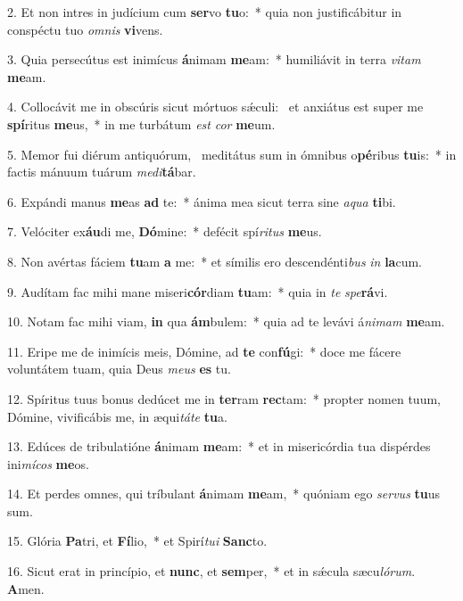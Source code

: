 2. Et non intres in judícium cum \textbf{ser}vo \textbf{tu}o:~*  quia non justificábitur in conspéctu tuo \textit{om}\textit{nis} \textbf{vi}vens.\

3. Quia persecútus est inimícus \textbf{á}nimam \textbf{me}am:~*  humiliávit in terra \textit{vi}\textit{tam} \textbf{me}am.\

4. Collocávit me in obscúris sicut mórtuos sǽculi: \dag\  et anxiátus est super me \textbf{spí}ritus \textbf{me}us,~*  in me turbátum \textit{est} \textit{cor} \textbf{me}um.\

5. Memor fui diérum antiquórum, \dag\  meditátus sum in ómnibus o\textbf{pé}ribus \textbf{tu}is:~*  in factis mánuum tuárum \textit{me}\textit{di}\textbf{tá}bar.\

6. Expándi manus \textbf{me}as \textbf{ad} te:~*  ánima mea sicut terra sine \textit{a}\textit{qua} \textbf{ti}bi.\

7. Velóciter ex\textbf{áu}di me, \textbf{Dó}mine:~*  defécit spí\textit{ri}\textit{tus} \textbf{me}us.\

8. Non avértas fáciem \textbf{tu}am \textbf{a} me:~*  et símilis ero descendénti\textit{bus} \textit{in} \textbf{la}cum.\

9. Audítam fac mihi mane miseri\textbf{cór}diam \textbf{tu}am:~*  quia in \textit{te} \textit{spe}\textbf{rá}vi.\

10. Notam fac mihi viam, \textbf{in} qua \textbf{ám}bulem:~*  quia ad te levávi á\textit{ni}\textit{mam} \textbf{me}am.\

11. Eripe me de inimícis meis, Dómine, ad \textbf{te} con\textbf{fú}gi:~*  doce me fácere voluntátem tuam, quia Deus \textit{me}\textit{us} \textbf{es} tu.\

12. Spíritus tuus bonus dedúcet me in \textbf{ter}ram \textbf{rec}tam:~*  propter nomen tuum, Dómine, vivificábis me, in æqui\textit{tá}\textit{te} \textbf{tu}a.\

13. Edúces de tribulatióne \textbf{á}nimam \textbf{me}am:~*  et in misericórdia tua dispérdes ini\textit{mí}\textit{cos} \textbf{me}os.\

14. Et perdes omnes, qui tríbulant \textbf{á}nimam \textbf{me}am,~*  quóniam ego \textit{ser}\textit{vus} \textbf{tu}us sum.\

15. Glória \textbf{Pa}tri, et \textbf{Fí}lio,~*  et Spirí\textit{tu}\textit{i} \textbf{Sanc}to.\

16. Sicut erat in princípio, et \textbf{nunc}, et \textbf{sem}per,~*  et in sǽcula sæcu\textit{ló}\textit{rum}. \textbf{A}men.\


